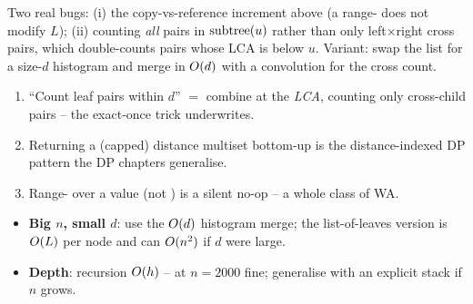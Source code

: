 
\begin{warningbox}
Two real bugs: (i) the copy-vs-reference increment above (a range- does
not modify $L$); (ii) counting \emph{all} pairs in $\operatorname{subtree}(u)$ rather than only
left$\times$right cross pairs, which double-counts pairs whose LCA is below $u$. Variant:
swap the list for a size-$d$ histogram  and merge in $O(d)$ with a convolution
for the cross count.
\end{warningbox}

\begin{insightbox}
\begin{enumerate}[nosep, leftmargin=1.6em]
  \item ``Count leaf pairs within $d$'' $=$ combine at the \emph{LCA}, counting only
        cross-child pairs -- the exact-once trick  underwrites.
  \item Returning a (capped) distance multiset bottom-up is the distance-indexed DP pattern
        the DP chapters generalise.
  \item Range- over a value (not \code{\&}) is a silent no-op -- a whole class of
        WA.
\end{enumerate}
\end{insightbox}

\begin{hardeningbox}
\begin{itemize}[nosep, leftmargin=1.4em]
  \item \textbf{Big $n$, small $d$}: use the $O(d)$ histogram merge; the list-of-leaves
        version is $O(L)$ per node and can $O(n^2)$ if $d$ were large.
  \item \textbf{Depth}: recursion $O(h)$ -- at $n=2000$ fine; generalise with an explicit
        stack if $n$ grows.
\end{itemize}
\end{hardeningbox}

